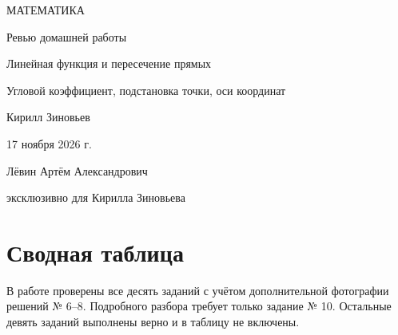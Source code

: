\documentclass[a4paper,12pt]{article}
\begin{document}
\thispagestyle{empty}
\begin{center}
\vspace*{24mm}
{\large\color{deepaccent} МАТЕМАТИКА}\par
\vspace{23mm}
{\LARGE Ревью домашней работы}\par
\vspace{15mm}
{\Large\color{accent} Линейная функция и пересечение прямых}\par
\vspace{9mm}
{\normalsize Угловой коэффициент, подстановка точки, оси координат}\par
\vspace{42mm}
{\large Кирилл Зиновьев}\par
\vspace{13mm}
{17 ноября 2026 г.}\par
\vfill
{\small Лёвин Артём Александрович}\par
{\small эксклюзивно для Кирилла Зиновьева}\par
\vspace{12mm}
\end{center}
\clearpage
\section*{Сводная таблица}
В работе проверены все десять заданий с учётом дополнительной фотографии решений № 6--8. Подробного разбора требует только задание № 10. Остальные девять заданий выполнены верно и в таблицу не включены.
\end{document}
